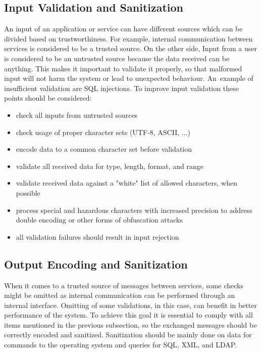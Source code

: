  \subsection*{Input Validation and Sanitization}
    An input of an application or service can have different sources which can be divided based on trustworthiness.
    For example, internal communication between services is considered to be a trusted source. On the other side,
    Input from a user is considered to be an untrusted source because the data received can be anything.
    This makes it important to validate it properly, so that malformed input will not harm the system or lead
    to unexpected behaviour. An~example of insufficient validation are SQL injections. To improve input
    validation these points should be considered:
    \begin{itemize}
      \item check all inputs from untrusted sources
      \item check usage of proper character sets (UTF-8, ASCII, ...)
      \item encode data to a common character set before validation
      \item validate all received data for type, length, format, and range
      \item validate received data against a "white" list of allowed characters, when possible
      \item process special and hazardous characters with increased precision to address double encoding or other
            forms of obfuscation attacks
      \item all validation failures should result in input rejection
    \end{itemize}

  \subsection*{Output Encoding and Sanitization}
    When it comes to a trusted source of messages between services, some checks might be omitted as internal
    communication can be performed through an internal interface. Omitting of some validations, in this case,
    can benefit in better performance of the system. To achieve this goal it is essential to comply with
    all items mentioned in the previous subsection, so the exchanged messages should be correctly encoded
    and sanitized. Sanitization should be mainly done on data for commands to the operating system and queries
    for SQL, XML, and LDAP.

